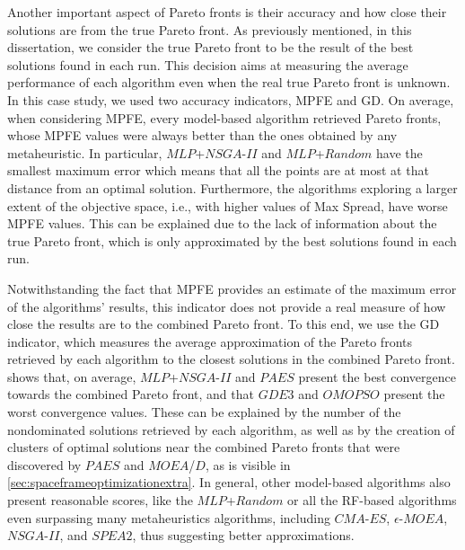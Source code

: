 Another important aspect of Pareto fronts is their accuracy and how close their solutions are from the true Pareto front. As previously mentioned, in this dissertation, we consider the true Pareto front to be the result of the best solutions found in each run. This decision aims at measuring the average performance of each algorithm even when the real true Pareto front is unknown. In this case study, we used two accuracy indicators, \ac{MPFE} and \ac{GD}. On average, when considering \ac{MPFE}, every model-based algorithm retrieved Pareto fronts, whose \ac{MPFE} values were always better than the ones obtained by any metaheuristic. In particular, $MLP$+$NSGA$-$II$ and $MLP$+$Random$ have the smallest maximum error which means that all the points are at most at that distance from an optimal solution. Furthermore, the algorithms exploring a larger extent of the objective space, i.e., with higher values of Max Spread, have worse \ac{MPFE} values. This can be explained due to the lack of information about the true Pareto front, which is only approximated by the best solutions found in each run. 

Notwithstanding the fact that \ac{MPFE} provides an estimate of the maximum error of the algorithms' results, this indicator does not provide a real measure of how close the results are to the combined Pareto front. To this end, we use the \ac{GD} indicator, which measures the average approximation of the Pareto fronts retrieved by each algorithm to the closest solutions in the combined Pareto front.  shows that, on average, $MLP$+$NSGA$-$II$ and $PAES$ present the best convergence towards the combined Pareto front, and that $GDE3$ and $OMOPSO$ present the worst convergence values. These can be explained by the number of the nondominated solutions retrieved by each algorithm, as well as by the creation of clusters of optimal solutions near the combined Pareto fronts that were discovered by $PAES$ and $MOEA$/$D$, as is visible in \cref{sec:spaceframeoptimizationextra}. In general, other model-based algorithms also present reasonable scores, like the $MLP$+$Random$ or all the \ac{RF}-based algorithms even surpassing many metaheuristics algorithms, including $CMA$-$ES$, $\epsilon$-$MOEA$, $NSGA$-$II$, and $SPEA2$, thus suggesting better approximations.

